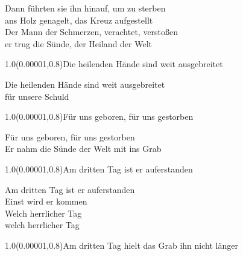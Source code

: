 \documentclass[aspectratio=169]{beamer}
\begin{document}
\begin{frame}
\centering
\color{white}
\huge{Dann führten sie ihn hinauf, um zu sterben} \\
\huge{ans Holz genagelt, das Kreuz aufgestellt} \\
\huge{Der Mann der Schmerzen, verachtet, verstoßen} \\
\huge{er trug die Sünde, der Heiland der Welt} \\

\begin{textblock}{1.0}(0.00001,0.8)\color{gray}\normalsize{Die heilenden Hände sind weit ausgebreitet}\end{textblock}
\end{frame}

\begin{frame}
\centering
\color{white}
\huge{Die heilenden Hände sind weit ausgebreitet} \\
\huge{für unsere Schuld} \\

\begin{textblock}{1.0}(0.00001,0.8)\color{gray}\normalsize{Für uns geboren, für uns gestorben}\end{textblock}
\end{frame}

\begin{frame}
\centering
\color{white}
\huge{Für uns geboren, für uns gestorben} \\
\huge{Er nahm die Sünde der Welt mit ins Grab} \\

\begin{textblock}{1.0}(0.00001,0.8)\color{gray}\normalsize{Am dritten Tag ist er auferstanden}\end{textblock}
\end{frame}

\begin{frame}
\centering
\color{white}
\huge{Am dritten Tag ist er auferstanden} \\
\huge{Einst wird er kommen} \\
\huge{Welch herrlicher Tag} \\
\huge{welch herrlicher Tag} \\

\begin{textblock}{1.0}(0.00001,0.8)\color{gray}\normalsize{Am dritten Tag hielt das Grab ihn nicht länger}\end{textblock}
\end{frame}
\end{document}
